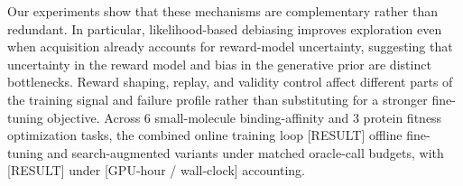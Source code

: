 
Our experiments show that these mechanisms are complementary rather than redundant. In particular, likelihood-based debiasing improves exploration even when acquisition already accounts for reward-model uncertainty, suggesting that uncertainty in the reward model and bias in the generative prior are distinct bottlenecks. Reward shaping, replay, and validity control affect different parts of the training signal and failure profile rather than substituting for a stronger fine-tuning objective. Across 6 small-molecule binding-affinity and 3 protein fitness optimization tasks, the combined online training loop [RESULT] offline fine-tuning and search-augmented variants under matched oracle-call budgets, with [RESULT] under [GPU-hour / wall-clock] accounting.

